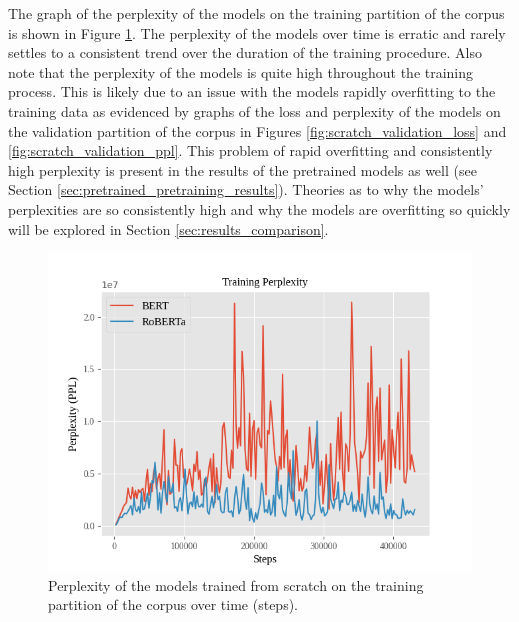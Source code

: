 \documentclass[12pt]{article}
\begin{document}
The graph of the perplexity of the models on the training partition of the corpus is shown in Figure \ref{fig:scratch_training_ppl}. The perplexity
of the models over time is erratic and rarely settles to a consistent trend over the duration of the training procedure. Also note that the perplexity
of the models is quite high throughout the training process. This is likely due to an issue with the models rapidly overfitting to the training data
as evidenced by graphs of the loss and perplexity of the models on the validation partition of the corpus in Figures \ref{fig:scratch_validation_loss}
and \ref{fig:scratch_validation_ppl}. This problem of rapid overfitting and consistently high perplexity is present in the results of the pretrained
models as well (see Section \ref{sec:pretrained_pretraining_results}). Theories as to why the models' perplexities are so consistently high and why
the models are overfitting so quickly will be explored in Section \ref{sec:results_comparison}.

\begin{figure}[!t]
    \includegraphics[width=\linewidth]{figures/scratch_training_ppl.png}
    \caption{Perplexity of the models trained from scratch on the training partition of the corpus over time (steps).}
    \label{fig:scratch_training_ppl}
\end{figure}
\end{document}
